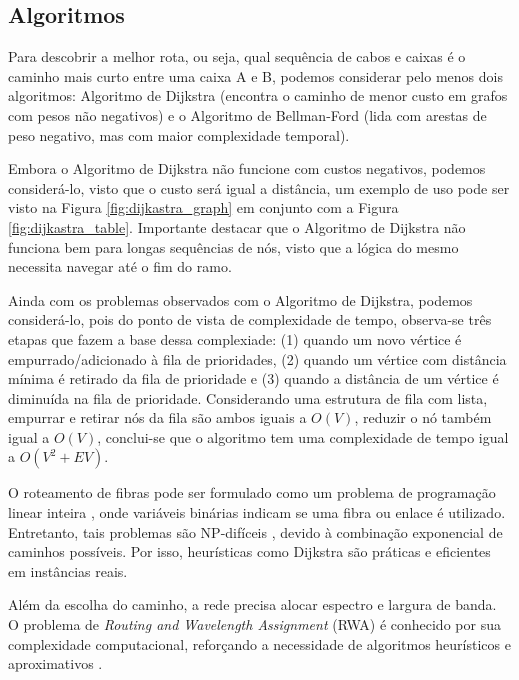 \subsection{Algoritmos}

Para descobrir a melhor rota, ou seja, qual sequência de cabos e caixas é o 
caminho mais curto entre uma caixa A e B, podemos considerar pelo menos dois
algoritmos: Algoritmo de Dijkstra (encontra o caminho de menor custo em grafos
com pesos não negativos) \cite{dijkstra2022note} e o Algoritmo de Bellman-Ford
(lida com arestas de peso negativo, mas com maior complexidade temporal).

Embora o Algoritmo de Dijkstra não funcione com custos negativos, podemos
considerá-lo, visto que o custo será igual a distância, um exemplo de uso pode
ser visto na Figura \ref{fig:dijkastra_graph} em conjunto com a Figura
\ref{fig:dijkastra_table}. Importante destacar que o Algoritmo de Dijkstra não
funciona bem para longas sequências de nós, visto que a lógica do mesmo
necessita navegar até o fim do ramo.

Ainda com os problemas observados com o Algoritmo de Dijkstra, podemos
considerá-lo, pois do ponto de vista de complexidade de tempo, observa-se três
etapas que fazem a base dessa complexiade: (1) quando um novo vértice é
empurrado/adicionado à fila de prioridades, (2) quando um vértice com distância
mínima é retirado da fila de prioridade e (3) quando a distância de um vértice
é diminuída na fila de prioridade. Considerando uma estrutura de fila com lista,
empurrar e retirar nós da fila são ambos iguais a $O(V)$, reduzir o nó também
igual a $O(V)$, conclui-se que o algoritmo tem uma complexidade de tempo igual
a $O(V^2 + EV)$.

O roteamento de fibras pode ser formulado como um problema de programação
linear inteira \cite{griva2008linear}, onde variáveis binárias indicam se uma
fibra ou enlace é utilizado. Entretanto, tais problemas são NP-difíceis
\cite{artigorwa}, devido à combinação exponencial de caminhos possíveis. Por
isso, heurísticas como Dijkstra são práticas e eficientes em instâncias reais.

Além da escolha do caminho, a rede precisa alocar espectro e largura de banda.
O problema de \textit{Routing and Wavelength Assignment} (RWA) é conhecido por
sua complexidade computacional, reforçando a necessidade de algoritmos
heurísticos e aproximativos \cite{artigorwa}.

